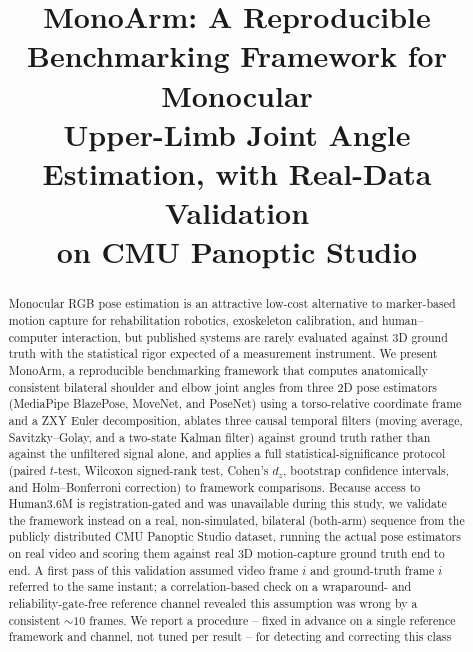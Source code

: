\documentclass[conference]{IEEEtran}
\begin{document}
\title{MonoArm: A Reproducible Benchmarking Framework for Monocular\\
Upper-Limb Joint Angle Estimation, with Real-Data Validation\\
on CMU Panoptic Studio}

\author{
}

\maketitle

\begin{abstract}
Monocular RGB pose estimation is an attractive low-cost alternative to
marker-based motion capture for rehabilitation robotics, exoskeleton
calibration, and human--computer interaction, but published systems are
rarely evaluated against 3D ground truth with the statistical rigor
expected of a measurement instrument. We present MonoArm, a reproducible
benchmarking framework that computes anatomically consistent bilateral
shoulder and elbow joint angles from three 2D pose estimators (MediaPipe
BlazePose, MoveNet, and PoseNet) using a torso-relative coordinate frame
and a ZXY Euler decomposition, ablates three causal temporal filters
(moving average, Savitzky--Golay, and a two-state Kalman filter) against
ground truth rather than against the unfiltered signal alone, and applies
a full statistical-significance protocol (paired $t$-test, Wilcoxon
signed-rank test, Cohen's $d_z$, bootstrap confidence intervals, and
Holm--Bonferroni correction) to framework comparisons. Because access to
Human3.6M is registration-gated and was unavailable during this study, we
validate the framework instead on a real, non-simulated, bilateral
(both-arm) sequence from the publicly distributed CMU Panoptic Studio
dataset, running the actual pose estimators on real video and scoring
them against real 3D motion-capture ground truth end to end. A first
pass of this validation assumed video frame $i$ and ground-truth frame
$i$ referred to the same instant; a correlation-based check on a
wraparound- and reliability-gate-free reference channel revealed this
assumption was wrong by a consistent $\sim\!10$ frames. We report a
procedure -- fixed in advance on a single reference framework and
channel, not tuned per result -- for detecting and correcting this class

\end{abstract}
\end{document}
